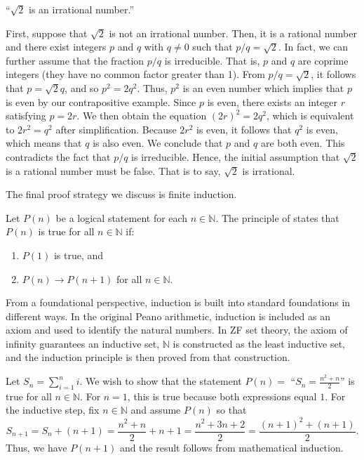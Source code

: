 \begin{example} \label{example:SquareRoot2}
``$\sqrt{2}$ is an irrational number.''

First, suppose that $\sqrt{2}$ is not an irrational number.
Then, it is a rational number and there exist integers $p$ and $q$ with $q \neq 0$ such that $p/q = \sqrt{2}$.
In fact, we can further assume that the fraction $p/q$ is irreducible.
That is, $p$ and $q$ are coprime integers (they have no common factor greater than 1).
From $p/q = \sqrt{2}$, it follows that $p = \sqrt{2} q$, and so $p^2 = 2 q^2$.
Thus, $p^2$ is an even number which implies that $p$ is even by our contrapositive example.
Since $p$ is even, there exists an integer $r$ satisfying $p = 2r$.
We then obtain the equation $(2r)^2 = 2q^2$, which is equivalent to $2r^2 = q^2$ after simplification.
Because $2r^2$ is even, it follows that $q^2$ is even, which means that $q$ is also even.
We conclude that $p$ and $q$ are both even.
This contradicts the fact that $p/q$ is irreducible.
Hence, the initial assumption that $\sqrt{2}$ is a rational number must be false.
That is to say, $\sqrt{2}$ is irrational.
\end{example}

The final proof strategy we discuss is finite induction.

\begin{definition}
Let $P(n)$ be a logical statement for each $n\in \mathbb{N}$.
The principle of  states that $P(n)$ is true for all $n\in \mathbb{N}$ if:

\begin{enumerate}
\item $P(1)$ is true, and
\item $P(n)\to P(n+1)$ for all $n\in \mathbb{N}$.
\end{enumerate}
\end{definition}

From a foundational perspective, induction is built into standard foundations in different ways.
In the original Peano arithmetic, induction is included as an axiom and used to identify the natural numbers.
In ZF set theory, the axiom of infinity guarantees an inductive set, $\mathbb N$ is constructed as the least inductive set, and the induction principle is then proved from that construction.

\begin{example}
Let $S_n = \sum_{i=1}^n i$.
We wish to show that the statement $P(n)=$ ``$S_n = \frac{n^2 + n}{2}$'' is true for all $n\in \mathbb{N}$.
For $n=1$, this is true because both expressions equal $1$.
For the inductive step, fix $n\in\mathbb N$ and assume $P(n)$ so that
\[ S_{n+1} = S_n + (n+1) = \frac{n^2 + n}{2} + n+1 = \frac{n^2 + 3n + 2}{2} = \frac{(n+1)^2+(n+1)}{2}. \]
Thus, we have $P(n+1)$ and the result follows from mathematical induction.
\end{example}

